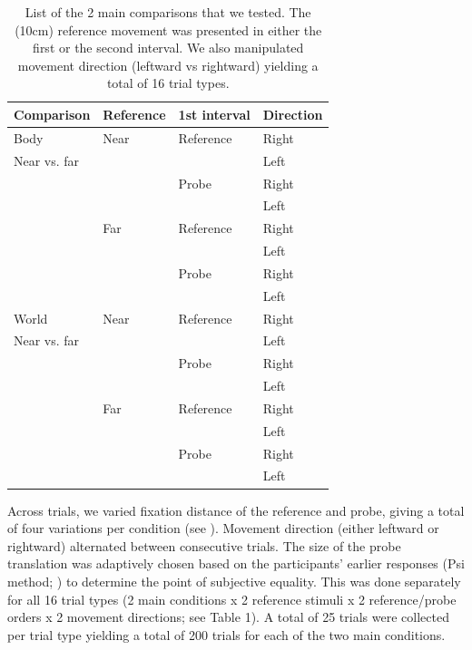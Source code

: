 \begin{table}
    \begin{tabular}{llll}
    Comparison & Reference & 1st interval & Direction \\
    \hline
    Body & Near & Reference & Right \\
    Near vs. far & & & Left \\    
    & & Probe & Right \\
    & & & Left \\
    \cline{2-4}
	& Far & Reference & Right \\
    & & & Left \\    
    & & Probe & Right \\
    & & & Left \\
    \hline
    World & Near & Reference & Right \\
    Near vs. far & & & Left \\    
    & & Probe & Right \\
    & & & Left \\
    \cline{2-4}
	& Far & Reference & Right \\
    & & & Left \\    
    & & Probe & Right \\
    & & & Left \\
    \end{tabular}

    \caption{List of the 2 main comparisons that we tested. The (10cm) reference movement was presented in either the first or the second interval. We also manipulated movement direction (leftward vs rightward) yielding a total of 16 trial types.}

    \label{p4:tab1}
\end{table}

Across trials, we varied fixation distance of the reference and probe, giving a total of four variations per condition (see ). Movement direction (either leftward or rightward) alternated between consecutive trials. The size of the probe translation was adaptively chosen based on the participants' earlier responses (Psi method; ) to determine the point of subjective equality. This was done separately for all 16 trial types (2 main conditions x 2 reference stimuli x 2 reference/probe orders x 2 movement directions; see Table 1). A total of 25 trials were collected per trial type yielding a total of 200 trials for each of the two main conditions.

